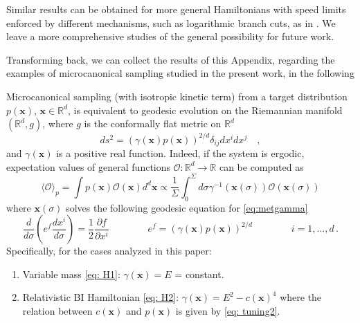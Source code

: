\documentclass[twoside,11pt]{article}
\begin{document}
Similar results can be obtained for more general Hamiltonians with speed limits enforced by different mechanisms, such as logarithmic branch cuts, as in \cite{Mathis:2020vdn}. We leave a more comprehensive studies of the general possibility for future work.

Transforming back, we can collect the results of this Appendix, regarding the examples of microcanonical sampling studied in the present work, in the
following
\begin{proposition}
 Microcanonical sampling (with isotropic kinetic term) from a target
 distribution $p (\mathbf{x}) $, $\mathbf{x} \in \mathbb{R}^d$, is equivalent to geodesic
 evolution on the Riemannian manifold $\left(\mathbb{R}^d, g\right)$, where $g$ is the conformally flat
  metric on $\mathbb{R}^d$
  \begin{equation}
    d  s^2 = (\gamma (\mathbf{x}) p (\mathbf{x}))^{2 / d} \delta_{i j} d x^i d x^j
    \quad, \label{eq:metgamma}
  \end{equation}
  and $\gamma (\mathbf{x})$ is a positive real function.  Indeed, if the system is ergodic,
  expectation values of general functions $\mathcal{O}: \mathbb{R}^d \to \mathbb R$ can be computed as
  \begin{equation}
    \langle \mathcal{O} \rangle_p = \int p (\mathbf{x}) \mathcal{O} (\mathbf{x}) d^d \mathbf{x} \propto
    \frac{1}{\Sigma} \int_0^{\Sigma} d \sigma \gamma^{- 1} (\mathbf{x} (\sigma))
    \mathcal{O} (\mathbf{x} (\sigma)) \label{eq:rhs}
  \end{equation}
  where $\mathbf{x} (\sigma)$ solves the following geodesic equation for
  \eqref{eq:metgamma}
  \begin{equation}\label{eq:geoEqProp}
    \frac{d}{d \sigma} \left(e^{f} \frac{d x^i}{d \sigma}\right) = \frac{1}{2} \frac{\partial f}{\partial x^i}
    \hspace{4em} e^{f} = (\gamma (\mathbf{x}) p (\mathbf{x}))^{2 / d} \qquad\qquad i = 1,\dots,d
    \, .
  \end{equation}
  Specifically, for the cases analyzed in this paper:
  \begin{enumerate}
    \item Variable mass \eqref{eq: H1}: $\gamma(\mathbf{x}) = E$ = constant.
    
    \item Relativistic BI Hamiltonian \eqref{eq: H2}: $\gamma(\mathbf{x}) = E^2 - c(\mathbf{x})^4$
    where the relation between $c(\mathbf{x})$ and $p(\mathbf{x})$ is given by \eqref{eq: tuning2}.
    

\end{enumerate}
\end{proposition}
\end{document}

